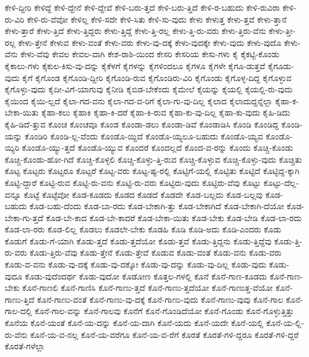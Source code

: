 {ಕೇಳಿ-ದ್ದೀರಿ
ಕೇಳಿದ್ದೆ
ಕೇಳಿ-ದ್ದೇನೆ
ಕೇಳಿ-ದ್ದೇವೆ
ಕೇಳಿ-ಬರು-ತ್ತದೆ
ಕೇಳಿ-ಬರು-ತ್ತಿದೆ
ಕೇಳಿ-ರ-ಬಹುದು
ಕೇಳಿ-ರುವಿರಾ
ಕೇಳಿ-ರು-ವಿರಿ
ಕೇಳಿ-ರು-ವೆವೋ
ಕೇಳಿಲ್ಲ
ಕೇಳಿ-ಸದೇ
ಕೇಳಿ-ಸಿತು
ಕೇಳಿ-ಸು-ವುದು
ಕೇಳು
ಕೇಳುತ್ತ
ಕೇಳು-ತ್ತವೆ
ಕೇಳು-ತ್ತಾನೆ
ಕೇಳು-ತ್ತಾರೆ
ಕೇಳು-ತ್ತಿದೆ
ಕೇಳು-ತ್ತಿದ್ದರು
ಕೇಳು-ತ್ತಿದ್ದೆ
ಕೇಳು-ತ್ತಿ-ರಲ್ಲ
ಕೇಳು-ತ್ತಿ-ರು-ವರು
ಕೇಳು-ತ್ತಿರು-ವೆನು
ಕೇಳು-ತ್ತೀ-ರಲ್ಲ
ಕೇಳು-ತ್ತೇನೆ
ಕೇಳುವ
ಕೇಳು-ವಂತೆ
ಕೇಳು-ವರು
ಕೇಳು-ವು-ದಕ್ಕೆ
ಕೇಳು-ವುದಕ್ಕೇ
ಕೇಳು-ವುದು
ಕೇಳು-ವುದೊ
ಕೇಳು-ವೆನು
ಕೇಳು-ವೆವು
ಕೇವಲ
ಕೇವಲ-ವಾಗಿ
ಕೇಶ-ರಾಶಿ-ಯಿಂದ
ಕೇಸರಿ
ಕೇಸರಿಯ
ಕೇಸು-ಗಳು
ಕೈ
ಕೈಕಟ್ಟಿ-ಕೊಂಡು
ಕೈಕಾಲು-ಗಳು
ಕೈಕುಲ-ಕಿಸು-ವು-ದನ್ನು
ಕೈಕೆಳಗೆ
ಕೈಗಳನ್ನು
ಕೈಗಳಿಂದಲೂ
ಕೈಗಳೂ
ಕೈಗಳೇ
ಕೈಗೂ-ಡುತ್ತವೆ
ಕೈಗೂಡು-ವುದು
ಕೈಗೆ
ಕೈಗೊಂಡ
ಕೈಗೊಂಡಿ-ದ್ದೀರಿ
ಕೈಗೊಂಡಿ-ರುವ
ಕೈಗೊಂಡಿರು-ವಿರಿ
ಕೈಗೊಂಡು
ಕೈಗೊಳ್ಳ-ದಿದ್ದ
ಕೈಗೊಳ್ಳುವ
ಕೈಗೊಳ್ಳು-ವುದು
ಕೈದೀ-ವಿಗೆ-ಯಾಗುವು
ಕೈನೀಡಿ
ಕೈಬಿಡ-ಬೇಕೆಂದು
ಕೈಮೇಲೆ
ಕೈಯನ್ನು
ಕೈಯಲ್ಲಿ
ಕೈಯಲ್ಲಿ-ರು-ವುದು
ಕೈಯಿಂದ
ಕೈಯಿ-ಲ್ಲದೆ
ಕೈಲಾ-ಗದ-ವನು
ಕೈಲಾ-ಗದ-ವ-ರಿಗೆ
ಕೈಲಾ-ಗು-ವು-ದಿಲ್ಲ
ಕೈಲಾದ
ಕೈಲಾದುದ್ದನ್ನೆಲ್ಲಾ
ಕೈಹಾ-ಕ-ಬೇಕಾ-ಯಿತು
ಕೈಹಾ-ಕಲು
ಕೈಹಾಕಿ
ಕೈಹಾ-ಕಿ-ದರೆ
ಕೈಹಾ-ಕಿ-ರುವ
ಕೈಹಾ-ಕು-ವು-ದಿಲ್ಲ
ಕೈಹಾ-ಕು-ವುದು
ಕೈಹಿ-ಡಿದು
ಕೈಹಿ-ಡಿದೆ-ತ್ತುವ
ಕೊಂಚ
ಕೊಂಚವೂ
ಕೊಂಡ
ಕೊಂಡಾ-ಡಲು
ಕೊಂಡಾ-ಡಿವೆ
ಕೊಂಡಾಡಿಸಿ
ಕೊಂಡಿ
ಕೊಂಡಿದ್ದ
ಕೊಂಡಿ-ಯನ್ನು
ಕೊಂಡಿರಿ
ಕೊಂಡಿ-ಲ್ಲ-ವೆಂದು
ಕೊಂಡೊ-ಯ್ದಿದೆ
ಕೊಂಡೊ-ಯ್ಯಲೂ-ಬಹುದು
ಕೊಂಡೊ-ಯ್ಯವ
ಕೊಂಡೊ-ಯ್ಯಿರಿ
ಕೊಂಡೊ-ಯ್ಯು-ತ್ತದೆ
ಕೊಂಡೊ-ಯ್ಯುವ
ಕೊಂದರೆ
ಕೊಂದಲ್ಲದೆ
ಕೊಂದ-ವ-ರನ್ನು
ಕೊಂದು
ಕೊಚ್ಚಿ-ಕೊಂಡು
ಕೊಚ್ಚಿ-ಕೊಂಡು-ಹೋ-ಗಿದೆ
ಕೊಚ್ಚಿ-ಕೊಳ್ಳಲಿ
ಕೊಚ್ಚಿ-ಕೊಳ್ಳು-ತ್ತಿ-ರುವ
ಕೊಚ್ಚಿ-ಕೊಳ್ಳುವ
ಕೊಚ್ಚಿ-ಕೊಳ್ಳು-ವುದು
ಕೊಚ್ಚಿತು
ಕೊಟ್ಟ
ಕೊಟ್ಟರು
ಕೊಟ್ಟರೂ
ಕೊಟ್ಟರೆ
ಕೊಟ್ಟ-ವರು
ಕೊಟ್ಟ-ಷ್ಟ-ರಲ್ಲಿ
ಕೊಟ್ಟಿಗೆ-ಯಲ್ಲಿ
ಕೊಟ್ಟಿತು
ಕೊಟ್ಟಿದೆ
ಕೊಟ್ಟಿದ್ದ-ಕ್ಕಾಗಿ
ಕೊಟ್ಟಿ-ದ್ದಾರೆ
ಕೊಟ್ಟಿ-ರುವ
ಕೊಟ್ಟಿ-ರು-ವನು
ಕೊಟ್ಟಿ-ರು-ವರು
ಕೊಟ್ಟಿರು-ವುದು
ಕೊಟ್ಟಿರು-ವೆವು
ಕೊಟ್ಟು
ಕೊಟ್ಟು-ದೆಲ್ಲ-ವನ್ನೂ
ಕೊಟ್ಟೆ
ಕೊಟ್ಟೆವೋ
ಕೊಡ-ಕೂಡದು
ಕೊಡದ
ಕೊಡದೆ
ಕೊಡದೇ
ಕೊಡ-ಬಲ್ಲದು
ಕೊಡ-ಬಲ್ಲವು
ಕೊಡ-ಬಹುದು
ಕೊಡ-ಬಹು-ದೆಂದು
ಕೊಡ-ಬಾ-ರದು
ಕೊಡ-ಬೇಕಾಗಿ-ತ್ತು
ಕೊಡ-ಬೇಕಾಗಿದೆ
ಕೊಡ-ಬೇಕಾಗಿ-ದೆಯೋ
ಕೊಡ-ಬೇಕಾ-ಗು-ತ್ತದೆ
ಕೊಡ-ಬೇ-ಕಾದ
ಕೊಡ-ಬೇ-ಕಾದರೆ
ಕೊಡ-ಬೇಕಾ-ಯಿತು
ಕೊಡ-ಬೇಕು
ಕೊಡ-ಬೇಡಿ
ಕೊಡ-ಲಾ-ರದು
ಕೊಡ-ಲಾ-ರರು
ಕೊಡ-ಲಿಲ್ಲ
ಕೊಡಲು
ಕೊಡಲೇ-ಬೇಕು
ಕೊಡಹಿ
ಕೊಡಿ
ಕೊಡಿ-ಅದು
ಕೊಡಿ-ಎಂದರು
ಕೊಡು
ಕೊಡುಗೆ
ಕೊಡು-ಗೆ-ಯಾಗಿ
ಕೊಡು-ತ್ತದೆ
ಕೊಡು-ತ್ತದೆಯೋ
ಕೊಡು-ತ್ತವೆ
ಕೊಡು-ತ್ತಿದ್ದನು
ಕೊಡು-ತ್ತಿದ್ದೆವು
ಕೊಡು-ತ್ತಿ-ರು-ವರು
ಕೊಡು-ತ್ತಿರು-ವೆವು
ಕೊಡು-ತ್ತೇನೆ
ಕೊಡು-ತ್ತೇವೆ
ಕೊಡುವ
ಕೊಡು-ವಂತೆ
ಕೊಡು-ವನು
ಕೊಡು-ವರು
ಕೊಡು-ವ-ವನು
ಕೊಡು-ವು-ದಕ್ಕೆ
ಕೊಡು-ವು-ದಕ್ಕೋ
ಕೊಡು-ವು-ದನ್ನು
ಕೊಡು-ವು-ದಿಲ್ಲ
ಕೊಡು-ವುದು
ಕೊಡು-ವುದೂ
ಕೊಡು-ವುದೆಂದರ್ಥ
ಕೊಡು-ವುದೋ
ಕೊಡೋಣ
ಕೊತ್ತಲ-ಗಳಲ್ಲಿ
ಕೊನೆ
ಕೊನೆ-ಗಾಣ-ಕೂಡದು
ಕೊನೆ-ಗಾಣ-ಬೇಕು
ಕೊನೆ-ಗಾಣಲಿ
ಕೊನೆ-ಗಾಣಿಸಿ
ಕೊನೆ-ಗಾಣು-ತ್ತದೆ
ಕೊನೆ-ಗಾಣು-ತ್ತದೆಯೋ
ಕೊನೆ-ಗಾಣುತ್ತ-ವೆಯೋ
ಕೊನೆ-ಗಾಣು-ತ್ತಿದೆ
ಕೊನೆ-ಗಾಣು-ವಂತೆ
ಕೊನೆ-ಗಾಣು-ವು-ದಕ್ಕೆ
ಕೊನೆ-ಗಾಣು-ವುದು
ಕೊನೆ-ಗಾಣು-ವುವು
ಕೊನೆ-ಗಾಲ
ಕೊನೆ-ಗಾಲ-ದಲ್ಲಿ
ಕೊನೆ-ಗಾಲ-ವನ್ನು
ಕೊನೆ-ಗಾಲವು
ಕೊನೆಗೆ
ಕೊನೆ-ಗೊಂಡಿದೆಯೋ
ಕೊನೆ-ಗೊಂಡು
ಕೊನೆ-ಗೊಳ್ಳುತ್ತಿತ್ತು
ಕೊನೆಯ
ಕೊನೆ-ಯಂತೆ
ಕೊನೆ-ಯ-ದನ್ನು
ಕೊನೆ-ಯ-ದಾಗಿ
ಕೊನೆ-ಯದು
ಕೊನೆ-ಯದೇ
ಕೊನೆ-ಯಲ್ಲಿ
ಕೊನೆ-ಯ-ಲ್ಲಿ-ರು-ವೆನು
ಕೊನೆ-ಯ-ವ-ನಲ್ಲ
ಕೊನೆ-ಯ-ವರೆಗೂ
ಕೊನೆ-ಯ-ವ-ರೆಗೆ
ಕೊರತೆ
ಕೊರತೆ-ಗಳಿ-ದ್ದರೂ
ಕೊರತೆ-ಗಳಿ-ದ್ದರೆ
ಕೊರತೆ-ಗಳೆಲ್ಲಾ
}
